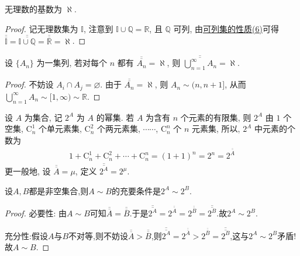 \documentclass[../../main.tex]{subfiles}
\begin{document}
\begin{corollary}
无理数的基数为 $\aleph$.
\end{corollary}
\begin{proof}
记无理数集为 $\mathbb{I}$, 注意到 $\mathbb{I} \cup \mathbb{Q} = \mathbb{R}$, 且 $\mathbb{Q}$ 可列, 由\hyperref[proposition:可列集的性质]{可列集的性质(6)}可得 $\overline{\overline{\mathbb{I}}} = \overline{\overline{\mathbb{I} \cup \mathbb{Q}}} = \overline{\overline{\mathbb{R}}} = \aleph$. 
\end{proof}

\begin{theorem}
设 $\{A_n\}$ 为一集列, 若对每个 $n$ 都有 $\overline{\overline{A_n}} = \aleph$, 则 $\overline{\overline{\bigcup_{n = 1}^{\infty} A_n}} = \aleph$.
\end{theorem}
\begin{proof}
不妨设 $A_i \cap A_j = \varnothing$. 由于 $\overline{\overline{A_n}} = \aleph$, 则 $A_n \sim (n, n + 1]$, 从而 $\bigcup_{n = 1}^{\infty} A_n \sim [1, \infty) \sim \mathbb{R}$.
\end{proof}

\begin{definition}
设 $A$ 为集合, 记 $2^A$ 为 $A$ 的幂集. 若 $A$ 为含有 $n$ 个元素的有限集, 则 $2^A$ 由 $1$ 个空集, $\mathrm{C}_{n}^1$ 个单元素集, $\mathrm{C}_{n}^2$ 个两元素集, $\cdots\cdots$, $\mathrm{C}_{n}^n$ 个 $n$ 元素集, 所以, $2^A$ 中元素的个数为
\begin{align*}
1 + \mathrm{C}_{n}^1 + \mathrm{C}_{n}^2 + \cdots + \mathrm{C}_{n}^n = (1 + 1)^n = 2^n = 2^{\overline{\overline{A}}}
\end{align*}
更一般地, 设 $\overline{\overline{A}} = \mu$, 定义 $\overline{\overline{2^A}} = 2^{\mu}$.
\end{definition}

\begin{proposition}\label{proposition:两集合对等的充要条件是幂集也对等}
设$A,B$都是非空集合,则$A\sim B$的充要条件是$2^A\sim 2^B$.
\end{proposition}
\begin{proof}
必要性:
由$A\sim B$可知$\overline{\overline{A}}=\overline{\overline{B}}$.于是$\overline{\overline{2^A}}=2^{\overline{\overline{A}}}=2^{\overline{\overline{B}}}=\overline{\overline{2^B}}.$故$2^A\sim 2^B$.

充分性:假设$A$与$B$不对等,则不妨设$\overline{\overline{A}}>\overline{\overline{B}}$,则$\overline{\overline{2^A}}=2^{\overline{\overline{A}}}>2^{\overline{\overline{B}}}=\overline{\overline{2^B}}$,这与$2^A\sim 2^B$矛盾!故$A\sim B$.
\end{proof}
\end{document}
